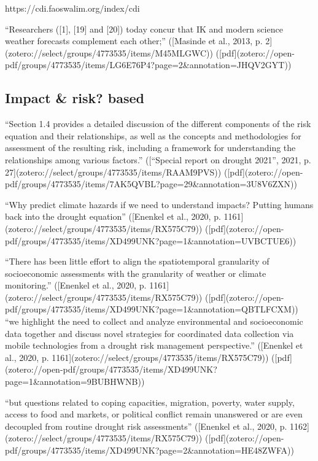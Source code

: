{https://cdi.faoswalim.org/index/cdi

“Researchers ([1], [19] and [20]) today concur that IK and modern science weather forecasts complement each other;” ([Masinde et al., 2013, p. 2](zotero://select/groups/4773535/items/M45MLGWC)) ([pdf](zotero://open-pdf/groups/4773535/items/LG6E76P4?page=2&annotation=JHQV2GYT))

\subsection{Impact \& risk? based}
“Section 1.4 provides a detailed discussion of the different components of the risk equation and their relationships, as well as the concepts and methodologies for assessment of the resulting risk, including a framework for understanding the relationships among various factors.” ([“Special report on drought 2021”, 2021, p. 27](zotero://select/groups/4773535/items/RAAM9PVS)) ([pdf](zotero://open-pdf/groups/4773535/items/7AK5QVBL?page=29&annotation=3U8V6ZXN))

“Why predict climate hazards if we need to understand impacts? Putting humans back into the drought equation” ([Enenkel et al., 2020, p. 1161](zotero://select/groups/4773535/items/RX575C79)) ([pdf](zotero://open-pdf/groups/4773535/items/XD499UNK?page=1&annotation=UVBCTUE6))

“There has been little effort to align the spatiotemporal granularity of socioeconomic assessments with the granularity of weather or climate monitoring.” ([Enenkel et al., 2020, p. 1161](zotero://select/groups/4773535/items/RX575C79)) ([pdf](zotero://open-pdf/groups/4773535/items/XD499UNK?page=1&annotation=QBTLFCXM))
“we highlight the need to collect and analyze environmental and socioeconomic data together and discuss novel strategies for coordinated data collection via mobile technologies from a drought risk management perspective.” ([Enenkel et al., 2020, p. 1161](zotero://select/groups/4773535/items/RX575C79)) ([pdf](zotero://open-pdf/groups/4773535/items/XD499UNK?page=1&annotation=9BUBHWNB))

“but questions related to coping capacities, migration, poverty, water supply, access to food and markets, or political conflict remain unanswered or are even decoupled from routine drought risk assessments” ([Enenkel et al., 2020, p. 1162](zotero://select/groups/4773535/items/RX575C79)) ([pdf](zotero://open-pdf/groups/4773535/items/XD499UNK?page=2&annotation=HE48ZWFA))

}
